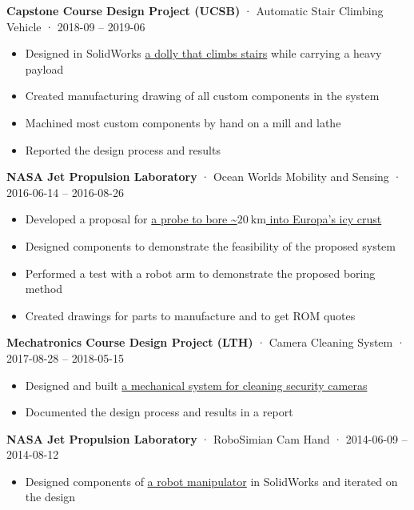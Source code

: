\documentclass[12pt, oneside]{article}
\newcommand{\jobtitle}[3] {
	{\bf #1} · {#2} · {#3} \vspace{-7pt} \\
}
\begin{document}
\begin{flushleft}
\jobtitle{Capstone Course Design Project (UCSB)}{Automatic Stair Climbing Vehicle}{2018-09 – 2019-06}
\begin{itemize}
	\item Designed in SolidWorks \href{https://portfolium.com/entry/automatic-stair-climbing-vehicle}{a dolly that climbs stairs} while carrying a heavy payload
	\item Created manufacturing drawing of all custom components in the system
	\item Machined most custom components by hand on a mill and lathe
	\item Reported the design process and results
\end{itemize}

\jobtitle{NASA Jet Propulsion Laboratory}{Ocean Worlds Mobility and Sensing}{2016-06-14 – 2016-08-26}
\begin{itemize}
	\item Developed a proposal for \href{https://portfolium.com/entry/owms-deep-subsurface-access-level-wind}{a probe to bore \textasciitilde$\SI{20}{\kilo\meter}$ into Europa's icy crust}
	\item Designed components to demonstrate the feasibility of the proposed system
	\item Performed a test with a robot arm to demonstrate the proposed boring method
	\item Created drawings for parts to manufacture and to get ROM quotes
\end{itemize}

\jobtitle{Mechatronics Course Design Project (LTH)}{Camera Cleaning System}{2017-08-28 – 2018-05-15}
\begin{itemize}
	\item Designed and built \href{https://portfolium.com/entry/automatic-security-camera-lens-cleaner}{a mechanical system for cleaning security cameras}
	\item Documented the design process and results in a report
\end{itemize}

\jobtitle{NASA Jet Propulsion Laboratory}{RoboSimian Cam Hand}{2014-06-09 – 2014-08-12}
\begin{itemize}
	\item Designed components of \href{https://portfolium.com/entry/rescue-robots}{a robot manipulator} in SolidWorks and iterated on the design
\end{itemize}


\end{flushleft}
\end{document}

